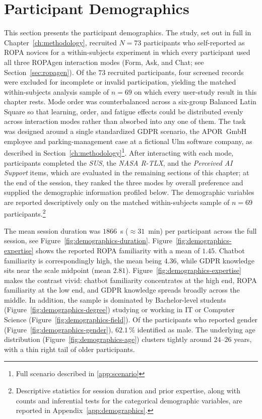 \section{Participant Demographics}
\label{sec:eval-demographics}

This section presents the participant demographics.
The study, set out in full in Chapter~\ref{ch:methodology}, recruited $N = 73$ participants who self-reported
as ROPA novices for a within-subjects experiment in which every
participant used all three ROPAgen interaction modes (Form, Ask, and
Chat; see Section~\ref{sec:ropagen}).
Of the $73$ recruited participants, four screened records were
excluded for incomplete or invalid participation, yielding the matched
within-subjects analysis sample of $n = 69$ on which every
user-study result in this chapter rests.
Mode order was counterbalanced
across a six-group Balanced Latin Square so that learning, order, and
fatigue effects could be distributed evenly across interaction modes rather than
absorbed into any one of them. The task was designed around a single standardized GDPR scenario, the
APOR~GmbH employee and parking-management case at a fictional Ulm
software company, as described in Section~\ref{ch:methodology}\footnote{Full scenario described in \ref{app:scenario}}.
After interacting with each mode, participants completed the \textit{SUS}, the \textit{NASA R-TLX}, and the \textit{Perceived AI
Support} items, which are evaluated in the remaining sections of this chapter;
at the end of the session, they ranked the three modes
by overall preference and supplied the demographic information
profiled below. The demographic variables are reported descriptively only on the
matched within-subjects sample of $n = 69$ participants.\footnote{Descriptive
statistics for session duration and prior expertise, along with
counts and inferential tests for the categorical demographic
variables, are reported in Appendix~\ref{app:demographics}.}

The mean session duration was $1866$~s ($\approx 31$~min) per
participant across the full session, see Figure~\ref{fig:demographics-duration}.
Figure~\ref{fig:demographics-expertise} shows the reported ROPA familiarity with a mean of $1.45$.
Chatbot familiarity is correspondingly high, the mean being $4.36$,
while GDPR knowledge sits near the scale midpoint (mean $2.81$).
Figure~\ref{fig:demographics-expertise} makes the contrast vivid:
chatbot familiarity concentrates at the high end, ROPA familiarity
at the low end, and GDPR knowledge spreads broadly across the middle.
In addition, the sample is dominated by Bachelor-level students
(Figure~\ref{fig:demographics-degree}) studying or working in IT or
Computer Science (Figure~\ref{fig:demographics-field}).
Of the participants who reported gender (Figure~\ref{fig:demographics-gender}), $62.1\,\%$
identified as male.
The underlying age distribution (Figure~\ref{fig:demographics-age}) clusters tightly around
$24$--$26$ years, with a thin right tail of older participants.

